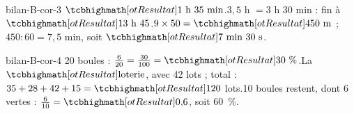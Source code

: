 \begin{blocEdition}{bilan-B-cor-3}
$\res{1\text{ h }35\text{ min}}$.$3{,}5$ h $=3$ h 30 min : fin à $\res{13\text{ h }45}$.$9\times50=\res{450\ \mathrm m}$ ; $450:60=7{,}5$ min, soit $\res{7\text{ min }30\text{ s}}$.
\end{blocEdition}
\begin{blocEdition}{bilan-B-cor-4}
20 boules : $\frac6{20}=\frac{30}{100}=\res{30\text{~\%}}$.La $\res{\text{loterie}}$, avec 42 lots ; total : $35+28+42+15=\res{120}$ lots.10 boules restent, dont 6 vertes : $\frac6{10}=\res{0{,}6}$, soit 60~\%.
\end{blocEdition}
